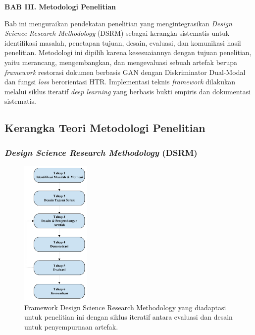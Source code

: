 \documentclass[12pt,a4paper]{article}
\begin{document}
\sloppy

\vspace{2cm}
\begin{center}
{\fontsize{14}{16.8}\selectfont\textbf{BAB III. Metodologi Penelitian}}\\[1em]
\end{center}
\label{sec:metodologi}
\setcounter{section}{3}
\setcounter{subsection}{0}
\vspace{2em}

Bab ini menguraikan pendekatan penelitian yang mengintegrasikan \textit{Design Science Research Methodology} (DSRM) sebagai kerangka sistematis untuk identifikasi masalah, penetapan tujuan, desain, evaluasi, dan komunikasi hasil penelitian. Metodologi ini dipilih karena kesesuaiannya dengan tujuan penelitian, yaitu merancang, mengembangkan, dan mengevaluasi sebuah artefak berupa \textit{framework} restorasi dokumen berbasis GAN dengan Diskriminator Dual-Modal dan fungsi \textit{loss} berorientasi HTR. Implementasi teknis \textit{framework} dilakukan melalui siklus iteratif \textit{deep learning} yang berbasis bukti empiris dan dokumentasi sistematis.
\vspace{1em}

\subsection{Kerangka Teori Metodologi Penelitian}
\label{subsec:kerangka-teori}
\vspace{0.8em}

\subsubsection{\textit{Design Science Research Methodology} (DSRM)}

\begin{figure}[htbp]
\centering
\includegraphics[width=0.3\textwidth]{images/DRSM.png}
\caption{Framework Design Science Research Methodology yang diadaptasi untuk penelitian ini dengan siklus iteratif antara evaluasi dan desain untuk penyempurnaan artefak.}
\label{fig:dsrm-framework}
\end{figure}
\end{document}
